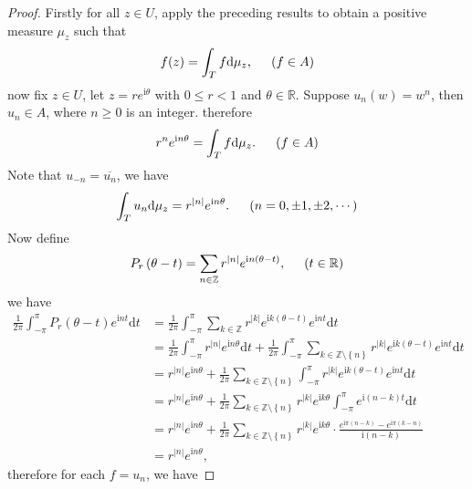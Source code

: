 \begin{proof}
Firstly for all $z\in U$, apply the preceding results to obtain a positive measure $\mu_z$ such that 
$$f(z)=\int_{T}f\mathrm{d}\mu_z,\hspace{0.5cm}(f\in A)$$
now fix $z\in U$, let $z=re^{\mathrm{i}\theta}$ with $0\le r<1$ and $\theta\in\mathbb{R}$. Suppose $u_n(w)=w^n$, then $u_n\in A$, where $n\ge 0$ is an integer. therefore 
$$
r^ne^{\mathrm{i}n\theta}=\int_T{f\mathrm{d}\mu _z}.\hspace{0.5cm}\left( f\in A \right) 
$$
Note that $u_{-n}=\overline{u_n}$, we have 
$$
\int_T{u_n\mathrm{d}\mu _z}=r^{\left| n \right|}e^{\mathrm{i}n\theta}.\hspace{0.5cm}\left( n=0,\pm 1,\pm 2,\cdots \right) 
$$
Now define 
$$
P_r\left( \theta -t \right) =\sum_{n\in \mathbb{Z}}{r^{\left| n \right|}e^{\mathrm{i}n\left( \theta -t \right)}},\hspace{0.5cm}\left( t\in \mathbb{R} \right) 
$$
we have 
$$
\begin{aligned}
\frac{1}{2\pi}\int_{-\pi}^{\pi}{P_r\left( \theta -t \right) e^{\mathrm{i}nt}\mathrm{d}t}&=\frac{1}{2\pi}\int_{-\pi}^{\pi}{\sum_{k\in \mathbb{Z}}{r^{\left| k \right|}e^{\mathrm{i}k\left( \theta -t \right)}}e^{\mathrm{i}nt}\mathrm{d}t}
\\
&=\frac{1}{2\pi}\int_{-\pi}^{\pi}{r^{\left| n \right|}e^{\mathrm{i}n\theta}\mathrm{d}t}+\frac{1}{2\pi}\int_{-\pi}^{\pi}{\sum_{k\in \mathbb{Z} \setminus \left\{ n \right\}}{r^{\left| k \right|}e^{\mathrm{i}k\left( \theta -t \right)}}e^{\mathrm{i}nt}\mathrm{d}t}
\\
&=r^{\left| n \right|}e^{\mathrm{i}n\theta}+\frac{1}{2\pi}\sum_{k\in \mathbb{Z} \setminus \left\{ n \right\}}{\int_{-\pi}^{\pi}{r^{\left| k \right|}e^{\mathrm{i}k\left( \theta -t \right)}e^{\mathrm{i}nt}\mathrm{d}t}}
\\
&=r^{\left| n \right|}e^{\mathrm{i}n\theta}+\frac{1}{2\pi}\sum_{k\in \mathbb{Z} \setminus \left\{ n \right\}}{r^{\left| k \right|}e^{\mathrm{i}k\theta}\int_{-\pi}^{\pi}{e^{\mathrm{i}\left( n-k \right) t}\mathrm{d}t}}
\\
&=r^{\left| n \right|}e^{\mathrm{i}n\theta}+\frac{1}{2\pi}\sum_{k\in \mathbb{Z} \setminus \left\{ n \right\}}{r^{\left| k \right|}e^{\mathrm{i}k\theta}\cdot \frac{e^{\mathrm{i}\pi \left( n-k \right)}-e^{\mathrm{i}\pi \left( k-n \right)}}{\mathrm{i}\left( n-k \right)}}
\\
&=r^{\left| n \right|}e^{\mathrm{i}n\theta},
\end{aligned}
$$
therefore for each $f=u_n$, we have 

\end{proof}
